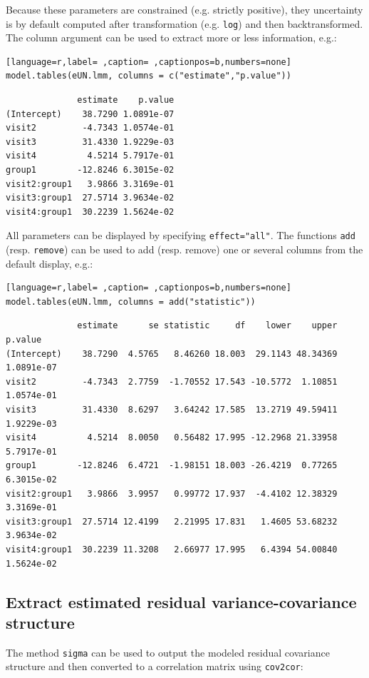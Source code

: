 \documentclass[12pt]{article}
\begin{document}
Because these parameters are constrained (e.g. strictly positive),
they uncertainty is by default computed after transformation
(e.g. \texttt{log}) and then backtransformed. The column argument can be used
to extract more or less information, e.g.:
\begin{lstlisting}[language=r,label= ,caption= ,captionpos=b,numbers=none]
model.tables(eUN.lmm, columns = c("estimate","p.value"))
\end{lstlisting}

\begin{verbatim}
              estimate    p.value
(Intercept)    38.7290 1.0891e-07
visit2         -4.7343 1.0574e-01
visit3         31.4330 1.9229e-03
visit4          4.5214 5.7917e-01
group1        -12.8246 6.3015e-02
visit2:group1   3.9866 3.3169e-01
visit3:group1  27.5714 3.9634e-02
visit4:group1  30.2239 1.5624e-02
\end{verbatim}


All parameters can be displayed by specifying
\texttt{effect="all"}.  The functions \texttt{add} (resp. \texttt{remove})
can be used to add (resp. remove) one or several columns from the
default display, e.g.:
\begin{lstlisting}[language=r,label= ,caption= ,captionpos=b,numbers=none]
model.tables(eUN.lmm, columns = add("statistic"))
\end{lstlisting}

\begin{verbatim}
              estimate      se statistic     df    lower    upper    p.value
(Intercept)    38.7290  4.5765   8.46260 18.003  29.1143 48.34369 1.0891e-07
visit2         -4.7343  2.7759  -1.70552 17.543 -10.5772  1.10851 1.0574e-01
visit3         31.4330  8.6297   3.64242 17.585  13.2719 49.59411 1.9229e-03
visit4          4.5214  8.0050   0.56482 17.995 -12.2968 21.33958 5.7917e-01
group1        -12.8246  6.4721  -1.98151 18.003 -26.4219  0.77265 6.3015e-02
visit2:group1   3.9866  3.9957   0.99772 17.937  -4.4102 12.38329 3.3169e-01
visit3:group1  27.5714 12.4199   2.21995 17.831   1.4605 53.68232 3.9634e-02
visit4:group1  30.2239 11.3208   2.66977 17.995   6.4394 54.00840 1.5624e-02
\end{verbatim}

\subsection{Extract estimated residual variance-covariance structure}
\label{sec:org6d04753}

The method \texttt{sigma} can be used to output the modeled residual
covariance structure and then converted to a correlation matrix using
\texttt{cov2cor}:
\end{document}
